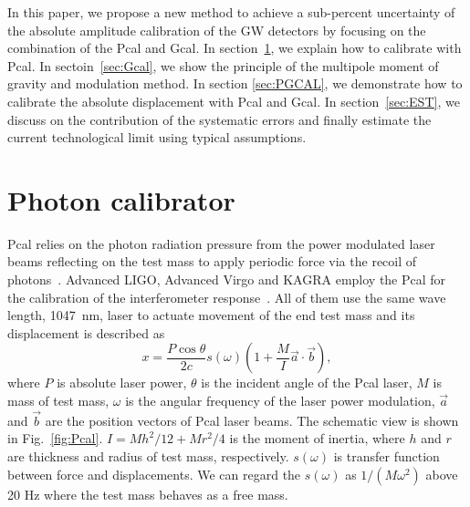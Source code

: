 \documentclass[%
 reprint,
superscriptaddress,
 amsmath,amssymb,
 aps,
]{revtex4-1}
\begin{document}
In this paper, we propose a new method to achieve a sub-percent uncertainty of the absolute amplitude calibration of the GW detectors by focusing on the combination of the Pcal and Gcal.
In section~\ref{sec:Pcal}, we explain how to calibrate with Pcal. In sectoin~\ref{sec:Gcal}, we show the principle of the multipole moment of gravity and modulation method.
In section \ref{sec:PGCAL}, we demonstrate how to calibrate the absolute displacement with Pcal and Gcal. In section~\ref{sec:EST}, we discuss on the contribution of the systematic errors and finally estimate the current technological limit using typical assumptions. 

\section{Photon calibrator} \label{sec:Pcal}
Pcal relies on the photon radiation pressure from the power modulated laser beams reflecting on the test mass to apply periodic force via the recoil of photons~\cite{doi:10.1063/1.4967303}. 
Advanced LIGO, Advanced Virgo and KAGRA employ the Pcal for the calibration of the interferometer response~\cite{0264-9381-34-1-015002, KAGRA_Pcal,0264-9381-32-2-024001}. All of them use the same wave length, 1047~nm, laser to actuate movement of the end test mass and its displacement is described as
\begin{equation}
 x = \frac{P \cos{\theta}}{2c} s(\omega)\left(1+\frac{M}{I}\vec{a} \cdot \vec{b} \right) , \label{eq:pcal}
\end{equation}
where $P$ is absolute laser power, $\theta$ is the incident angle of the Pcal laser, $M$ is  mass of test mass, $\omega$ is the angular frequency of the laser power modulation, $\vec{a}$ and $\vec{b}$ are the position vectors of Pcal laser beams. The schematic view is shown in Fig.~\ref{fig:Pcal}. $I=Mh^2/12+Mr^2/4$ is the moment of inertia, where $h$ and  $r$ are thickness and radius of test mass, respectively. $s(\omega)$ is transfer function between force and displacements. We can regard the $s(\omega)$ as $1/(M \omega^2)$ above 20 Hz where the test mass behaves as a free mass. 
\end{document}
